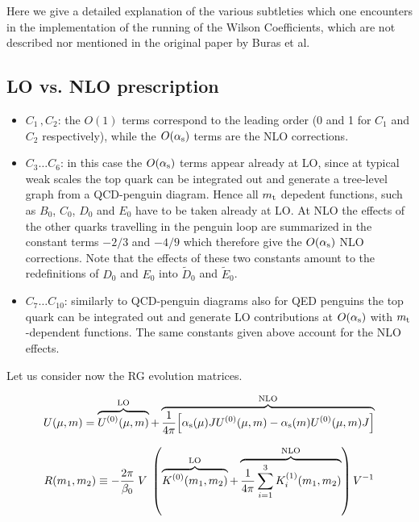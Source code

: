 
Here we give a detailed explanation of the various 
subtleties which one encounters in the implementation
of the running of the Wilson Coefficients, which are 
not described nor mentioned in the original paper 
by Buras et al.

\subsection{LO vs. NLO prescription}

\begin{itemize}
\item $C_1 \,, C_2$: the $O(1)$ terms correspond to the leading order (0 and 1 for $C_1$ and $C_2$ respectively), 
while the $O(\alpha_{\rm s})$ terms are the NLO corrections.\\

\item $C_3 \ldots C_6$: in this case the $O(\alpha_{\rm s})$ terms appear already at LO, since at typical weak scales
the top quark can be integrated out and generate a tree-level graph from a QCD-penguin diagram. Hence all 
$m_{\mathrm t}$ depedent functions, such as $B_0$, $C_0$, $D_0$ and $E_0$ have to be taken already at LO. At NLO 
the effects of the other quarks travelling in the penguin loop are summarized in the constant terms 
$-2/3$ and $-4/9$ which therefore give the $O(\alpha_{\rm s})$ NLO corrections. Note that the effects of these two constants
amount to the redefinitions of $D_0$ and $E_0$ into $\tilde D_0$ and $\tilde E_0$. \\

\item $C_7 \ldots C_{10}$: similarly to QCD-penguin diagrams also for QED penguins the top quark can be integrated out
and generate LO contributions at $O(\alpha_{\rm s})$ with $m_{\mathrm t}$-dependent functions. The same constants given above account 
for the NLO effects.\\

\end{itemize}

Let us consider now the RG evolution matrices.

\begin{equation}
U(\mu,m)= \overbrace{U^{(0)}(\mu,m)}^\text{LO} + 
\overbrace{ {1 \over 4\pi} \Big[ \alpha_{\rm s}(\mu) J U^{(0)}(\mu,m) - \alpha_{\rm s}(m) U^{(0)}(\mu,m) J \Big] }^\text{NLO}
\end{equation}
 
\begin{equation}
R(m_1,m_2) \equiv -\frac{2\pi}{\beta_0} \; V \; \left(
\overbrace{K^{(0)}(m_1,m_2)}^\text{LO} +
\overbrace{\frac{1}{4\pi} \sum_{i=1}^{3} K_i^{(1)}(m_1,m_2)}^\text{NLO} \right) V^{-1}
\end{equation}

